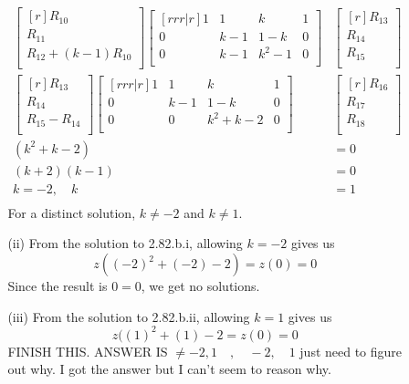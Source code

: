 \documentclass{report}
\begin{document}
\begin{enumerate}
\begin{enumerate}
\begin{enumerate}
\begin{align*}
\begin{bmatrix}[r]
		R_{10}\\
		R_{11}\\
		R_{12} + (k-1)R_{10}\\	
		\end{bmatrix}
		\begin{bmatrix}[rrr|r]
		1 & 1 & k & 1\\
		0 & k-1 & 1-k & 0\\
		0 & k-1 & k^2-1 & 0\\
		\end{bmatrix}&
		\begin{bmatrix}[r]
		R_{13}\\ R_{14}\\ R_{15}\\
		\end{bmatrix}\\
		\begin{bmatrix}[r]
		R_{13}\\
		R_{14}\\
		R_{15} - R_{14}\\
		\end{bmatrix}
		\begin{bmatrix}[rrr|r]
		1 & 1 & k & 1\\
		0 & k-1 & 1-k & 0\\
		0 & 0 & k^2+k-2 & 0\\
		\end{bmatrix}&
		\begin{bmatrix}[r]
		R_{16}\\ R_{17}\\ R_{18}\\
		\end{bmatrix}\\
		(k^2+k-2) &=0\\
		(k+2)(k-1) &=0\\
		k = -2, \quad k &= 1\\
		\end{align*}
		For a distinct solution, $k \neq -2$ and $k \neq 1$.\\
		\item [(ii)]
		From the solution to 2.82.b.i, allowing $k=-2$ gives us
		\[ z((-2)^2+(-2)-2) = z(0) = 0 \]
		Since the result is $0 = 0$, we get no solutions.\\
		\item [(iii)]
		From the solution to 2.82.b.ii, allowing $k=1$ gives us
		\[ z((1)^2 + (1) - 2 = z(0) = 0 \]
		FINISH THIS. ANSWER IS $\neq -2, 1 \quad , \quad -2, \quad 1$ just need to figure out why. I got the answer but I can't seem to reason why.

\end{enumerate}
\end{enumerate}
\end{enumerate}
\end{document}
